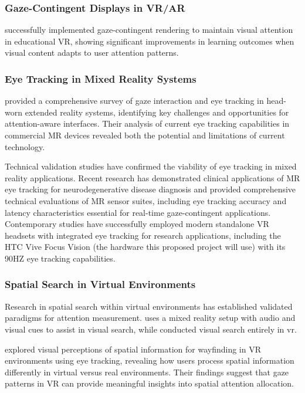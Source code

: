 \documentclass[12pt,letterpaper]{article}
\begin{document}
\subsubsection{Gaze-Contingent Displays in VR/AR}

 \citet{han2024utilizing} successfully implemented gaze-contingent rendering to maintain visual attention in educational VR, showing significant improvements in learning outcomes when visual content adapts to user attention patterns.

\subsubsection{Eye Tracking in Mixed Reality Systems}

\citet{plopski2022eye} provided a comprehensive survey of gaze interaction and eye tracking in head-worn extended reality systems, identifying key challenges and opportunities for attention-aware interfaces. Their analysis of current eye tracking capabilities in commercial MR devices revealed both the potential and limitations of current technology.

Technical validation studies have confirmed the viability of eye tracking in mixed reality applications. Recent research has demonstrated clinical applications of MR eye tracking for neurodegenerative disease diagnosis and provided comprehensive technical evaluations of MR sensor suites, including eye tracking accuracy and latency characteristics essential for real-time gaze-contingent applications. Contemporary studies have successfully employed modern standalone VR headsets with integrated eye tracking for research applications, including the HTC Vive Focus Vision (the hardware this proposed project will use) with its 90HZ eye tracking capabilities.

\subsubsection{Spatial Search in Virtual Environments}

Research in spatial search within virtual environments has established validated paradigms for attention measurement. \citet{seeOrHear2023} uses a mixed reality setup with audio and visual cues to assist in visual search, while \citet{chiossi2024searching} conducted visual search entirely in vr.

\citet{kim2020exploring} explored visual perceptions of spatial information for wayfinding in VR environments using eye tracking, revealing how users process spatial information differently in virtual versus real environments. Their findings suggest that gaze patterns in VR can provide meaningful insights into spatial attention allocation.
\end{document}

